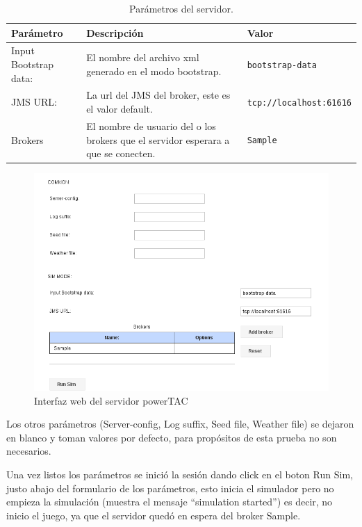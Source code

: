 \begin{table}[!h]
	\begin{center}
		\begin{tabular}{|p{2.5cm}|p{7cm}|p{4.5cm}|}\hline
			\textbf{Parámetro} & \textbf{Descripción} & \textbf{Valor} \\ \hline
				Input Bootstrap data:  &El nombre del archivo xml generado en el modo bootstrap. & \texttt{bootstrap-data} \\ \hline
				JMS URL: & La url del JMS del broker, este es el valor default. & \texttt{tcp://localhost:61616} \\\hline
				Brokers  & El nombre de usuario del o los brokers que el servidor esperara a que se conecten. & \texttt{Sample}
			\\ \hline
		\end{tabular}			
	\end{center}
	\caption{ Parámetros del servidor.}
	\label{tab:parametros}
\end{table}


\begin{figure}[!h]
	\centering
	\includegraphics[width=13cm]{img/interfazFormularioWeb.png}
	\caption{Interfaz web del servidor powerTAC}
	\label{fig:interfazFormularioWeb}
\end{figure}

Los otros parámetros (Server-config, Log suffix, Seed file, Weather file) se dejaron en blanco y toman valores por defecto, para propósitos de esta prueba no son necesarios.

Una vez listos los parámetros se inició la sesión dando click en el boton Run Sim, justo abajo del formulario de los parámetros, esto inicia el simulador pero no empieza la simulación %
(muestra el mensaje ``simulation started'') 
es decir, no inicio el juego, ya que el servidor quedó en espera del broker Sample.

